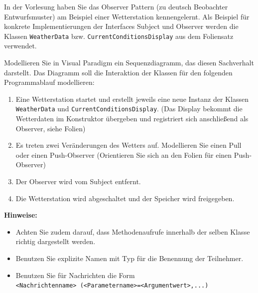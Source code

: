 \documentclass{abgabe}
\begin{document}
\begin{questions}

    In der Vorlesung haben Sie das Observer Pattern (zu deutsch Beobachter Entwurfsmuster) am Beispiel einer Wetterstation kennengelernt.
    Als Beispiel für konkrete Implementierungen der Interfaces Subject und Observer werden die Klassen \texttt{WeatherData} bzw. \texttt{CurrentConditionsDisplay} aus dem Foliensatz verwendet.

    Modellieren Sie in Visual Paradigm ein Sequenzdiagramm, das diesen Sachverhalt darstellt.
    Das Diagramm soll die Interaktion der Klassen für den folgenden Programmablauf modellieren:

    \begin{enumerate}
        \item Eine Wetterstation startet und erstellt jeweils eine neue Instanz der Klassen \texttt{WeatherData} und \texttt{CurrentConditionsDisplay}. (Das Display bekommt die Wetterdaten im Konstruktor übergeben und registriert sich anschließend als Observer, siehe Folien)
        \item Es treten zwei Veränderungen des Wetters auf. Modellieren Sie einen Pull oder einen Push-Observer (Orientieren Sie sich an den Folien für einen Push-Observer)
        \item Der Observer wird vom Subject entfernt.
        \item Die Wetterstation wird abgeschaltet und der Speicher wird freigegeben.
    \end{enumerate}

    \textbf{Hinweise:}

    \begin{itemize}
        \item Achten Sie zudem darauf, dass Methodenaufrufe innerhalb der selben Klasse richtig dargestellt werden.
        \item Benutzen Sie explizite Namen mit Typ für die Benennung der Teilnehmer.
        \item Benutzen Sie für Nachrichten die Form \\ \texttt{<Nachrichtenname> (<Parametername>=<Argumentwert>,...)}
    \end{itemize}


\end{questions}
\end{document}
